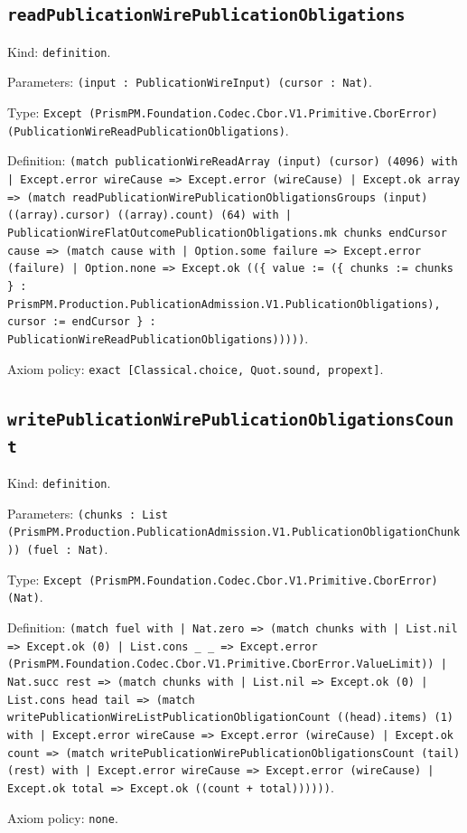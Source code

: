 \documentclass[11pt]{article}
\begin{document}
\subsection*{\texttt{readPublicationWirePublicationObligations}}
\noindent Kind: \texttt{definition}.\par
\noindent Parameters: \texttt{(input : PublicationWireInput) (cursor : Nat)}.\par
\noindent Type: \texttt{Except (PrismPM.Foundation.Codec.Cbor.V1.Primitive.CborError) (PublicationWireReadPublicationObligations)}.\par
\noindent Definition: \texttt{(match publicationWireReadArray (input) (cursor) (4096) with | Except.error wireCause => Except.error (wireCause) | Except.ok array => (match readPublicationWirePublicationObligationsGroups (input) ((array).cursor) ((array).count) (64) with | PublicationWireFlatOutcomePublicationObligations.mk chunks endCursor cause => (match cause with | Option.some failure => Except.error (failure) | Option.none => Except.ok ((\{ value := (\{ chunks := chunks \} : PrismPM.Production.PublicationAdmission.V1.PublicationObligations), cursor := endCursor \} : PublicationWireReadPublicationObligations)))))}.\par
\noindent Axiom policy: \texttt{exact [Classical.choice, Quot.sound, propext]}.\par
\subsection*{\texttt{writePublicationWirePublicationObligationsCount}}
\noindent Kind: \texttt{definition}.\par
\noindent Parameters: \texttt{(chunks : List (PrismPM.Production.PublicationAdmission.V1.PublicationObligationChunk)) (fuel : Nat)}.\par
\noindent Type: \texttt{Except (PrismPM.Foundation.Codec.Cbor.V1.Primitive.CborError) (Nat)}.\par
\noindent Definition: \texttt{(match fuel with | Nat.zero => (match chunks with | List.nil => Except.ok (0) | List.cons \_ \_ => Except.error (PrismPM.Foundation.Codec.Cbor.V1.Primitive.CborError.ValueLimit)) | Nat.succ rest => (match chunks with | List.nil => Except.ok (0) | List.cons head tail => (match writePublicationWireListPublicationObligationCount ((head).items) (1) with | Except.error wireCause => Except.error (wireCause) | Except.ok count => (match writePublicationWirePublicationObligationsCount (tail) (rest) with | Except.error wireCause => Except.error (wireCause) | Except.ok total => Except.ok ((count + total))))))}.\par
\noindent Axiom policy: \texttt{none}.\par
\end{document}
